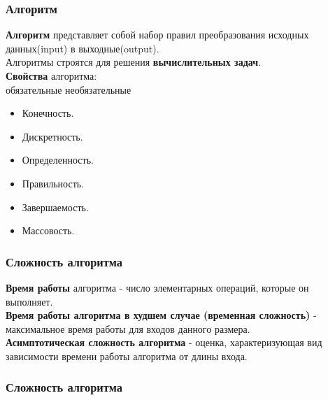 \documentclass[russian, 12pt]{beamer}
\begin{document}
\begin{frame}
\frametitle{Алгоритм}
\textbf{Алгоритм} представляет собой набор правил преобразования исходных данных(input) 
в выходные(output).\\[0.2cm]
Алгоритмы строятся для решения \textbf{вычислительных задач}.\\[0.2cm]
\textbf{Свойства} алгоритма:\\[0.2cm]
обязательные \hspace{3cm} необязательные
\begin{multicols}{2}
\begin{itemize}
  \item [1] Конечность.\\[0.3cm]

  \item [2] Дискретность.\\[0.3cm]

  \item [3] Определенность.\\[0.3cm]
  
  \item [4] Правильность. \\[0.3cm]
  
  \item [5] Завершаемость. \\[0.3cm]
  
  \item [5] Массовость. \\

\end{itemize}
\end{multicols}
\end{frame}
\begin{frame}
\frametitle{Сложность алгоритма}
\textbf{Время работы} алгоритма - 
число элементарных операций, которые он выполняет.\\[0.3cm]
\textbf{Время работы алгоритма в худшем случае (временная сложность)} - 
максимальное время работы для входов данного размера. \\[0.3cm]
\textbf{Асимптотическая сложность алгоритма} - 
оценка, характеризующая вид зависимости времени работы алгоритма от длины входа.

\end{frame}
\lstset{style=mystyle}
\begin{frame}
\frametitle{Сложность алгоритма}

\end{frame}
\end{document}
